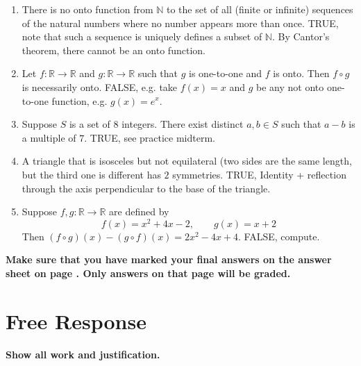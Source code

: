 \documentclass[12pt]{article}
\begin{document}
\begin{enumerate}
\item There is no onto function from $\mathbb{N}$ to the set of all (finite or infinite) sequences of the natural numbers where no number appears more than once. TRUE, note that such a sequence is uniquely defines a subset of $\mathbb{N}$. By Cantor's theorem, there cannot be an onto function.
\vspace{0.6cm}
\item Let $f:\mathbb{R}\to\mathbb{R}$ and $g:\mathbb{R}\to\mathbb{R}$ such that $g$ is one-to-one and $f$ is onto. Then $f\circ g$ is necessarily onto. FALSE, e.g. take
$f(x)=x$ and $g$ be any not onto one-to-one function, e.g. $g(x)=e^{x}$.
\vspace{0.6cm}
\item Suppose $S$ is a set of $8$ integers. There exist distinct $a, b \in S$ such that $a - b$ is a multiple of $7$. TRUE, see practice midterm.
\vspace{0.6cm}
\item A triangle that is isosceles but not equilateral (two sides are the same length, but the third one is different has $2$ symmetries. TRUE, Identity + reflection through the axis perpendicular to the base of the triangle.
\vspace{0.6cm}
\item Suppose $f,g:\mathbb{R}\to\mathbb{R}$ are defined by
\[
f(x)=x^2+4x-2,\qquad g(x)=x+2
\]
Then $(f\circ g)(x)-(g\circ f)(x)=2x^2-4x+4$. FALSE, compute.
\end{enumerate}
\begin{center}
\textbf{Make sure that you have marked your final answers on the answer sheet on page \pageref{answersheet}. Only answers on that page will be graded.}
\end{center}
\newpage
\section*{Free Response}

\textbf{Show all work and justification.} 
\end{document}
